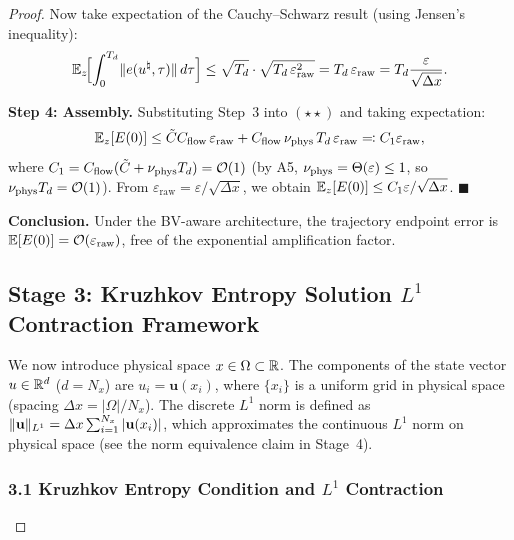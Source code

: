 \begin{proof}
Now take expectation of the Cauchy--Schwarz result (using Jensen's inequality):
\begin{equation}
  \mathbb{E}_z\!\Bigl[\int_0^{T_d} \lVert e(u^{\natural},\tau) \rVert \, d\tau\Bigr] \leq \sqrt{T_d} \cdot \sqrt{T_d \, \varepsilon_{\mathrm{raw}}^2} = T_d \, \varepsilon_{\mathrm{raw}} = T_d \frac{\varepsilon}{\sqrt{\Delta x}}.
\end{equation}

\textbf{Step 4: Assembly.}
Substituting Step~3 into $(\star\star)$ and taking expectation:
\begin{equation}
  \mathbb{E}_z[E(0)] \leq \tilde{C} C_{\mathrm{flow}} \, \varepsilon_{\mathrm{raw}} + C_{\mathrm{flow}} \, \nu_{\mathrm{phys}} \, T_d \, \varepsilon_{\mathrm{raw}} \eqqcolon C_1 \varepsilon_{\mathrm{raw}},
\end{equation}
where $C_1 = C_{\mathrm{flow}}(\tilde{C} + \nu_{\mathrm{phys}} T_d) = \mathcal{O}(1)$ (by A5, $\nu_{\mathrm{phys}} = \Theta(\varepsilon) \leq 1$, so $\nu_{\mathrm{phys}} T_d = \mathcal{O}(1)$).
From $\varepsilon_{\mathrm{raw}} = \varepsilon / \sqrt{\Delta x}$, we obtain $\mathbb{E}_z[E(0)] \leq C_1 \varepsilon / \sqrt{\Delta x}$.
\hfill$\blacksquare$

\textbf{Conclusion.} Under the BV-aware architecture, the trajectory endpoint error is $\mathbb{E}[E(0)] = \mathcal{O}(\varepsilon_{\mathrm{raw}})$, free of the exponential amplification factor.

\subsection{Stage 3: Kruzhkov Entropy Solution \texorpdfstring{$L^1$}{L1} Contraction Framework}\label{sec:stage3}

\begin{remark}
We now introduce physical space $x \in \Omega \subset \mathbb{R}$. The components of the state vector $u \in \mathbb{R}^d$ ($d = N_x$) are $u_i = \mathbf{u}(x_i)$, where $\{x_i\}$ is a uniform grid in physical space (spacing $\Delta x = |\Omega|/N_x$).
The discrete $L^1$ norm is defined as $\lVert \mathbf{u} \rVert_{L^1} = \Delta x \sum_{i=1}^{N_x} |\mathbf{u}(x_i)|$, which approximates the continuous $L^1$ norm on physical space (see the norm equivalence claim in Stage~4).
\end{remark}

\subsubsection{3.1 Kruzhkov Entropy Condition and \texorpdfstring{$L^1$}{L1} Contraction}


\end{proof}
